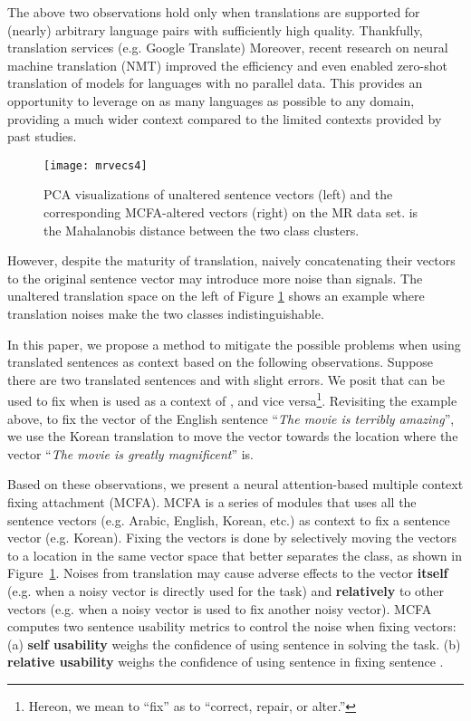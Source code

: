 \documentclass{article}
\begin{document}
The above two observations hold only when translations are supported for (nearly) arbitrary language pairs with sufficiently high quality.
Thankfully, translation services (e.g. Google Translate)
Moreover, recent research on neural machine translation (NMT) \cite{bahdanau2014neural} improved the efficiency
and even enabled 
zero-shot translation \cite{johnson2016google} 
of models
for languages with no parallel data.
This provides an opportunity to leverage on as many languages as possible to any domain, providing a much wider context compared to the limited contexts provided by past studies.

\begin{figure}[t]
	\centering
	\texttt{[image: mrvecs4]}
	\caption{PCA visualizations of unaltered sentence vectors (left) and the corresponding MCFA-altered vectors (right)  on the MR data set.
	 is the Mahalanobis distance between the two class clusters.
}
	\label{fig:mrvecs}
\end{figure}

However, despite the maturity of translation,
naively concatenating their vectors to the original sentence vector
may introduce more noise 
than signals.
The unaltered translation space on the left of Figure \ref{fig:mrvecs} shows an example
where translation noises make the two classes indistinguishable.




In this paper, we propose a method to mitigate the possible problems when using translated sentences as context based on the following observations. Suppose there are two translated sentences  and  with slight errors. We posit that  can be used to fix  when  is used as a context of , and vice versa\footnote{Hereon, we mean to ``fix'' as to ``correct, repair, or alter.''}. Revisiting the example above, to fix the vector of the English sentence ``\textit{The movie is terribly amazing}'', we use the Korean translation to move the vector towards the location where the vector ``\textit{The movie is greatly magnificent}'' is.






Based on these observations, we present a neural attention-based multiple context fixing attachment (MCFA). MCFA is a series of modules that uses all the sentence vectors (e.g. Arabic, English, Korean, etc.) as context to fix a sentence vector (e.g. Korean). 
Fixing the vectors is done by selectively moving the vectors to a location in the same vector space that better separates the class, as shown in Figure~\ref{fig:mrvecs}.
Noises from translation may cause adverse effects to the vector
\textbf{itself} (e.g. when a noisy vector is directly used for the task) and \textbf{relatively} to other vectors (e.g. when a noisy vector is used to fix another noisy vector).
MCFA computes two sentence
usability metrics to control the noise when fixing vectors:
(a) \textbf{self usability}  weighs the confidence of using sentence  in solving the task.
(b) \textbf{relative usability}  weighs the confidence of using sentence  in fixing sentence .
\end{document}
